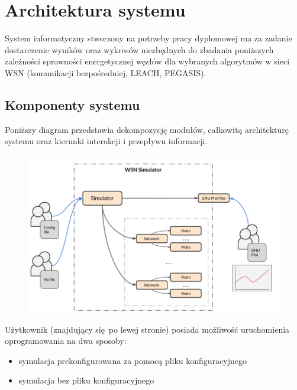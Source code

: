 \documentclass[a4paper,12pt,twoside,openany]{report}
\begin{document}
\chapter{Architektura systemu}

System informatyczny stworzony na potrzeby pracy dyplomowej ma za zadanie dostarczenie wyników oraz wykresów niezbędnych do zbadania poniższych zależności sprawności energetycznej 
węzłów dla wybranych algorytmów w sieci WSN (komunikacji bezpośredniej, LEACH, PEGASIS).

\section{Komponenty systemu}

Poniższy diagram przedstawia dekompozycję modułów, całkowitą architekturę systemu oraz kierunki interakcji i przepływu informacji.

\begin{figure}[H]
 \centering
 \includegraphics[width=13cm]{images/architektura_systemu.png} 
\end{figure}

Użytkownik (znajdujący się po lewej stronie) posiada możliwość uruchomienia oprogramowania na dwa sposoby: 

\begin{itemize}
 \item symulacja prekonfigurowana za pomocą pliku konfiguracyjnego
 \item symulacja bez pliku konfiguracyjnego
\end{itemize}
\end{document}
